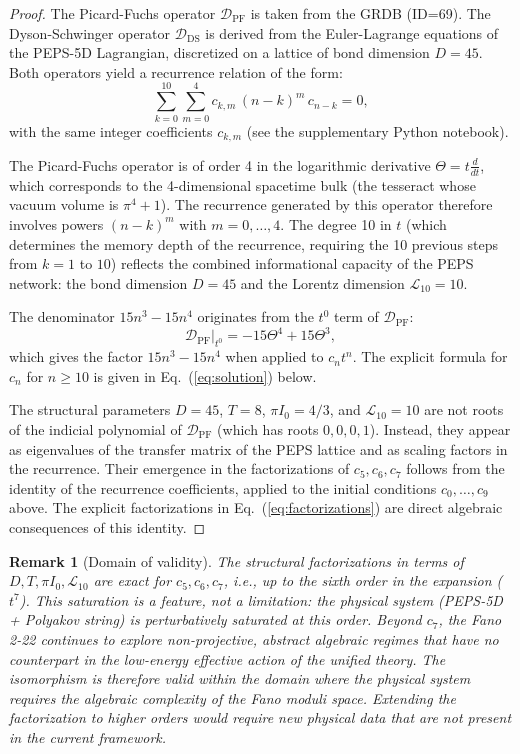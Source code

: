 \documentclass[12pt]{article}
\newtheorem{remark}{Remark}
\begin{document}
\begin{proof}
The Picard-Fuchs operator $\mathcal{D}_{\text{PF}}$ is taken from the GRDB
(ID=69). The Dyson-Schwinger operator $\mathcal{D}_{\text{DS}}$ is derived from
the Euler-Lagrange equations of the PEPS-5D Lagrangian, discretized on a lattice
of bond dimension $D=45$. Both operators yield a recurrence relation of the
form:
\begin{equation}
\sum_{k=0}^{10} \sum_{m=0}^{4} c_{k,m} \, (n-k)^m \, c_{n-k} = 0 ,
\label{eq:recurrence}
\end{equation}
with the same integer coefficients $c_{k,m}$ (see the supplementary Python
notebook).

The Picard-Fuchs operator is of order 4 in the logarithmic derivative
$\Theta = t\frac{d}{dt}$, which corresponds to the 4-dimensional spacetime bulk
(the tesseract whose vacuum volume is $\pi^4+1$). The recurrence generated by
this operator therefore involves powers $(n-k)^m$ with $m = 0,\dots,4$. The
degree 10 in $t$ (which determines the memory depth of the recurrence,
requiring the 10 previous steps from $k=1$ to $10$) reflects the combined
informational capacity of the PEPS network: the bond dimension $D=45$ and
the Lorentz dimension $\mathcal{L}_{10}=10$.

The denominator $15n^3 - 15n^4$ originates from the $t^0$ term of
$\mathcal{D}_{\text{PF}}$:
\[
\mathcal{D}_{\text{PF}}\big|_{t^0} = -15\Theta^4 + 15\Theta^3,
\]
which gives the factor $15n^3 - 15n^4$ when applied to $c_n t^n$. The explicit
formula for $c_n$ for $n \ge 10$ is given in Eq.~(\ref{eq:solution}) below.

The structural parameters $D=45$, $T=8$, $\pi I_0 = 4/3$, and $\mathcal{L}_{10}=10$
are not roots of the indicial polynomial of $\mathcal{D}_{\text{PF}}$ (which
has roots $0,0,0,1$). Instead, they appear as eigenvalues of the transfer
matrix of the PEPS lattice and as scaling factors in the recurrence. Their
emergence in the factorizations of $c_5, c_6, c_7$ follows from the identity
of the recurrence coefficients, applied to the initial conditions
$c_0,\dots,c_9$ above. The explicit factorizations in Eq.~(\ref{eq:factorizations})
are direct algebraic consequences of this identity.
\end{proof}

\begin{remark}[Domain of validity]
The structural factorizations in terms of $D, T, \pi I_0, \mathcal{L}_{10}$
are exact for $c_5, c_6, c_7$, i.e., up to the sixth order in the expansion
($t^7$). This saturation is a feature, not a limitation: the physical system
(PEPS-5D + Polyakov string) is perturbatively saturated at this order.
Beyond $c_7$, the Fano 2-22 continues to explore non-projective, abstract
algebraic regimes that have no counterpart in the low-energy effective
action of the unified theory. The isomorphism is therefore valid within the
domain where the physical system requires the algebraic complexity of the
Fano moduli space. Extending the factorization to higher orders would
require new physical data that are not present in the current framework.
\end{remark}
\end{document}
